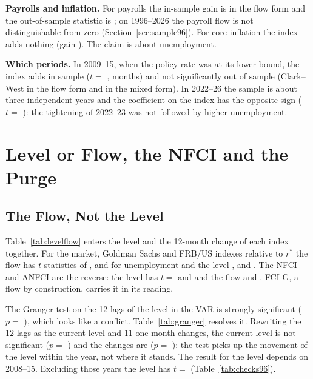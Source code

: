 \documentclass[11pt]{article}
\newcommand{\rs}{r^{*}}
\begin{document}
\begin{appendices}
\textbf{Payrolls and inflation.} For payrolls the in-sample gain is  in the flow form and the out-of-sample statistic is ; on 1996--2026 the payroll flow is not distinguishable from zero (Section~\ref{sec:sample96}). For core inflation the index adds nothing (gain ). The claim is about unemployment.

\textbf{Which periods.} In 2009--15, when the policy rate was at its lower bound, the index adds in sample ($t=$ ,  months) and not significantly out of sample (Clark--West  in the flow form and  in the mixed form). In 2022--26 the sample is about three independent years and the coefficient on the index has the opposite sign ($t=$ ): the tightening of 2022--23 was not followed by higher unemployment.



\section{Level or Flow, the NFCI and the Purge}\label{app:levelflow}
\subsection{The Flow, Not the Level}\label{sec:levelflow}
Table~\ref{tab:levelflow} enters the level and the 12-month change of each index together. For the market, Goldman Sachs and FRB/US indexes relative to $\rs$ the flow has $t$-statistics of ,  and  for unemployment and the level ,  and . The NFCI and ANFCI are the reverse: the level has $t=$  and  and the flow  and . FCI-G, a flow by construction, carries it in its reading.



The Granger test on the 12 lags of the level in the VAR is strongly significant ($p=$ ), which looks like a conflict. Table~\ref{tab:granger} resolves it. Rewriting the 12 lags as the current level and 11 one-month changes, the current level is not significant ($p=$ ) and the changes are ($p=$ ): the test picks up the movement of the level within the year, not where it stands. The result for the level depends on 2008--15. Excluding those years the level has $t=$  (Table~\ref{tab:checks96}).


\end{appendices}
\end{document}
